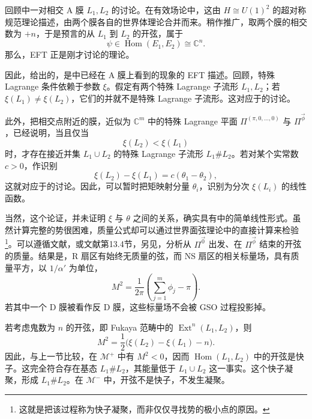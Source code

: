 回顾中一对相交 A 膜 $L_1,L_2$ 的讨论。在有效场论中，这由 $H\cong U(1)^2$ 的超对称规范理论描述，由两个膜各自的世界体理论合并而来。稍作推广，取两个膜的相交数为 $+n$，于是预言的从 $L_1$ 到 $L_2$ 的开弦，属于
\[
\psi\in\operatorname{Hom}(E_1,E_2)\cong\mathbb{C}^n.
\]
那么，EFT 正是刚才讨论的理论。

因此，给出的，是中已经在 A 膜上看到的现象的 EFT 描述。回顾，特殊 Lagrange 条件依赖于参数 $\xi$。假定有两个特殊 Lagrange 子流形 $L_1,L_2$；若 $\xi(L_1)\ne\xi(L_2)$，它们的并就不是特殊 Lagrange 子流形。这对应于的讨论。

此外，把相交点附近的膜，近似为 $\mathbb{C}^m$ 中的特殊 Lagrange 平面 $\Pi^{(\pi,0,\ldots,0)}$ 与 $\Pi^{\vec\phi}$，已经说明，当且仅当
\[
\xi(L_2)<\xi(L_1)
\]
时，才存在接近并集 $L_1\cup L_2$ 的特殊 Lagrange 子流形 $L_1\#L_2$。若对某个实常数 $c>0$，作识别
\begin{equation}\label{eq:5.94}
\xi(L_2)-\xi(L_1)=c(\theta_1-\theta_2),
\end{equation}
这就对应于的讨论。因此，可以暂时把矩映射分量 $\theta_i$，识别为分次 $\xi(L_i)$ 的线性函数。

当然，这个论证，并未证明 $\xi$ 与 $\theta$ 之间的关系，确实具有中的简单线性形式。虽然计算完整的势很困难，质量公式却可以通过世界面弦理论中的直接计算来检验\footnote{这就是把该过程称为快子凝聚，而非仅仅寻找势的极小点的原因。}。可以遵循文献，或文献第13.4节，另见，分析从 $\Pi^{\vec0}$ 出发、在 $\Pi^{\vec\phi}$ 结束的开弦的质量。结果是，R 扇区有始终无质量的弦，而 NS 扇区的相关标量场，具有质量平方，以 $1/\alpha'$ 为单位，
\begin{equation}\label{eq:5.95}
M^2=\frac{1}{2\pi}\left(\sum_{j=1}^m\phi_j-\pi\right).
\end{equation}
若其中一个 D 膜被看作反 D 膜，这些标量场不会被 GSO 过程投影掉。

若考虑鬼数为 $n$ 的开弦，即 Fukaya 范畴中的 $\operatorname{Ext}^n(L_1,L_2)$，则
\begin{equation}\label{eq:5.96}
M^2=\frac12\bigl(\xi(L_2)-\xi(L_1)-n\bigr).
\end{equation}
因此，与上一节比较，在 $\mathcal{M}^+$ 中有 $M^2<0$，因而 $\operatorname{Hom}(L_1,L_2)$ 中的开弦是快子。这完全符合存在基态 $L_1\#L_2$，其能量低于 $L_1\cup L_2$ 这一事实。这个快子凝聚，形成 $L_1\#L_2$。在 $\mathcal{M}^-$ 中，开弦不是快子，不发生凝聚。

